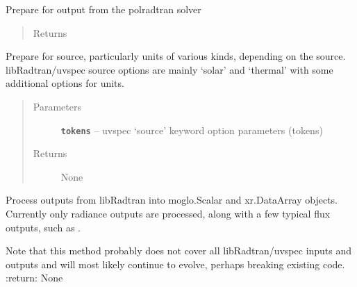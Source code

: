\documentclass[a4paper,10pt,english]{sphinxmanual}
\begin{document}
\begin{fulllineitems}
\begin{fulllineitems}
\label{packages:librad.Case.prepare_for_polradtran}
Prepare for output from the polradtran solver
\begin{quote}\begin{description}
\item[{Returns}] \leavevmode


\end{description}\end{quote}

\end{fulllineitems}


\begin{fulllineitems}
\label{packages:librad.Case.prepare_for_source}
Prepare for source, particularly units of various kinds, depending on the source.
libRadtran/uvspec source options are mainly `solar' and `thermal' with some additional options
for units.
\begin{quote}\begin{description}
\item[{Parameters}] \leavevmode
\textbf{\texttt{tokens}} -- uvspec `source' keyword option parameters (tokens)

\item[{Returns}] \leavevmode
None

\end{description}\end{quote}

\end{fulllineitems}


\begin{fulllineitems}
\label{packages:librad.Case.process_outputs}
Process outputs from libRadtran into moglo.Scalar and xr.DataArray objects.
Currently only radiance outputs are processed, along with a few typical flux outputs, such as .

Note that this method probably does not cover all libRadtran/uvspec inputs and outputs and will most
likely continue to evolve, perhaps breaking existing code.
:return: None

\end{fulllineitems}


\end{fulllineitems}
\end{document}
